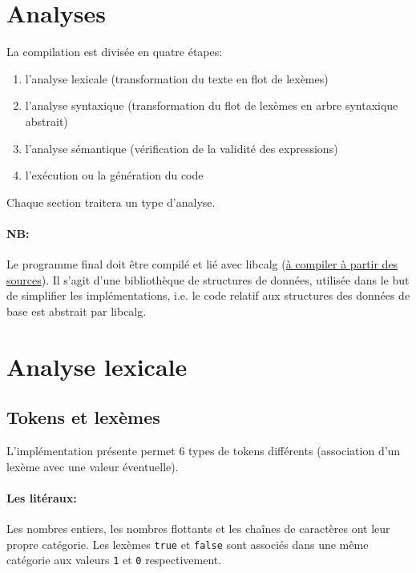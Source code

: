 \documentclass[paper=a4, fontsize=11pt]{scrartcl}
\numberwithin{equation}{section}		%
\numberwithin{figure}{section}			%
\numberwithin{table}{section}				%
\begin{document}
\newpage
\section{Analyses}

La compilation est divisée en quatre étapes:

\begin{enumerate}
\item l'analyse lexicale (transformation du texte en flot de lexèmes)
\item l'analyse syntaxique (transformation du flot de lexèmes en arbre syntaxique abstrait)
\item l'analyse sémantique (vérification de la validité des expressions)
\item l'exécution ou la génération du code
\end{enumerate}

Chaque section traitera un type d'analyse.

\paragraph{NB:}
Le programme final doit être compilé et lié avec libcalg (\href{https://github.com/fragglet/c-algorithms}{à compiler à partir des sources}).
Il s'agit d'une bibliothèque de structures de données, utilisée dans le but de simplifier les implémentations, i.e. le code relatif aux structures des données de base est abstrait par libcalg.

\newpage
\section{Analyse lexicale}

\subsection{Tokens et lexèmes}

L'implémentation présente permet 6 types de tokens différents (association d'un lexème avec une valeur éventuelle).

\paragraph{Les litéraux:}
Les nombres entiers, les nombres flottants et les chaînes de caractères ont leur propre catégorie.
Les lexèmes \texttt{true} et \texttt{false} sont associés dans une même catégorie aux valeurs \texttt{1} et \texttt{0} respectivement.
\end{document}
